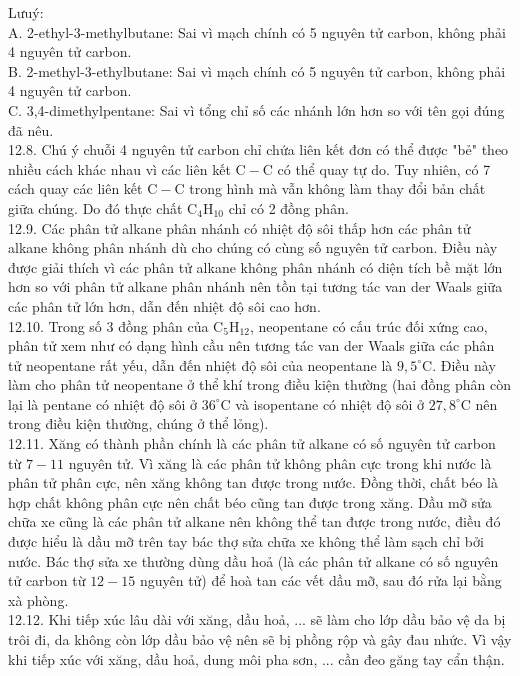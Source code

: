 \documentclass[10pt]{article}
\begin{document}
Lưuý:\\
A. 2-ethyl-3-methylbutane: Sai vì mạch chính có 5 nguyên tử carbon, không phải 4 nguyên tử carbon.\\
B. 2-methyl-3-ethylbutane: Sai vì mạch chính có 5 nguyên tử carbon, không phải 4 nguyên tử carbon.\\
C. 3,4-dimethylpentane: Sai vì tổng chỉ số các nhánh lớn hơn so với tên gọi đúng đã nêu.\\
12.8. Chú ý chuỗi 4 nguyên tử carbon chỉ chứa liên kết đơn có thể được "bẻ" theo nhiều cách khác nhau vì các liên kết $\mathrm{C}-\mathrm{C}$ có thể quay tự do. Tuy nhiên, có 7 cách quay các liên kết $\mathrm{C}-\mathrm{C}$ trong hình mà vẫn không làm thay đổi bản chất giữa chúng. Do đó thực chất $\mathrm{C}_{4} \mathrm{H}_{10}$ chỉ có 2 đồng phân.\\
12.9. Các phân tử alkane phân nhánh có nhiệt độ sôi thấp hơn các phân tử alkane không phân nhánh dù cho chúng có cùng số nguyên tử carbon. Điều này được giải thích vì các phân tử alkane không phân nhánh có diện tích bề mặt lớn hơn so với phân tử alkane phân nhánh nên tồn tại tương tác van der Waals giữa các phân tử lớn hơn, dẫn đến nhiệt độ sôi cao hơn.\\
12.10. Trong số 3 đồng phân của $\mathrm{C}_{5} \mathrm{H}_{12}$, neopentane có cấu trúc đối xứng cao, phân tử xem như có dạng hình cầu nên tương tác van der Waals giữa các phân tử neopentane rất yếu, dẫn đến nhiệt độ sôi của neopentane là $9,5^{\circ} \mathrm{C}$. Điều này làm cho phân tử neopentane ở thể khí trong điều kiện thường (hai đồng phân còn lại là pentane có nhiệt độ sôi ở $36^{\circ} \mathrm{C}$ và isopentane có nhiệt độ sôi ở $27,8^{\circ} \mathrm{C}$ nên trong điều kiện thường, chúng ở thể lỏng).\\
12.11. Xăng có thành phần chính là các phân tử alkane có số nguyên tử carbon từ $7-11$ nguyên tử. Vì xăng là các phân tử không phân cực trong khi nước là phân tử phân cực, nên xăng không tan được trong nước. Đồng thời, chất béo là hợp chất không phân cực nên chất béo cũng tan được trong xăng. Dầu mỡ sửa chữa xe cũng là các phân tử alkane nên không thể tan được trong nước, điều đó được hiểu là dầu mỡ trên tay bác thợ sửa chữa xe không thể làm sạch chỉ bởi nước. Bác thợ sửa xe thường dùng dầu hoả (là các phân tử alkane có số nguyên tử carbon từ $12-15$ nguyên tử) để hoà tan các vết dầu mỡ, sau đó rửa lại bằng xà phòng.\\
12.12. Khi tiếp xúc lâu dài với xăng, dầu hoả, ... sẽ làm cho lớp dầu bảo vệ da bị trôi đi, da không còn lớp dầu bảo vệ nên sẽ bị phồng rộp và gây đau nhức. Vì vậy khi tiếp xúc với xăng, dầu hoả, dung môi pha sơn, ... cần đeo găng tay cẩn thận.\\
\end{document}
